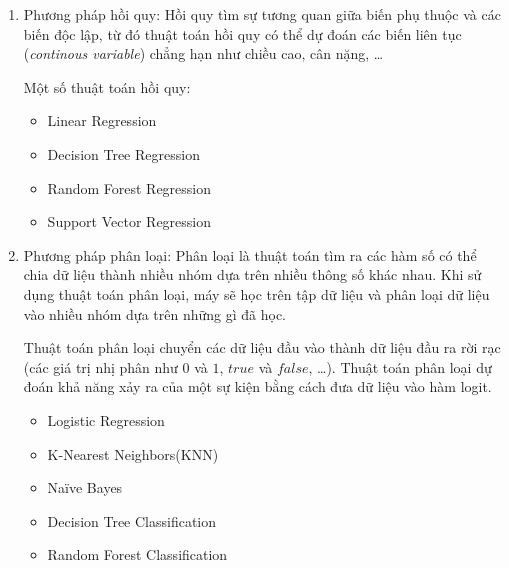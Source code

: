 \begin{enumerate}
    \item Phương pháp hồi quy:
          Hồi quy tìm sự tương quan giữa biến phụ thuộc và các biến độc lập, từ đó thuật toán hồi quy có thể dự đoán các biến liên tục (\textit{continous variable}) chẳng hạn như chiều cao, cân nặng, \dots\cite{webpage1}

          Một số thuật toán hồi quy:
          \begin{itemize}
              \item Linear Regression
              \item Decision Tree Regression
              \item Random Forest Regression
              \item Support Vector Regression
          \end{itemize}
    \item Phương pháp phân loại:
          Phân loại là thuật toán tìm ra các hàm số có thể chia dữ liệu thành nhiều nhóm dựa trên nhiều thông số khác nhau. Khi sử dụng thuật toán phân loại, máy sẽ học trên tập dữ liệu và phân loại dữ liệu vào nhiều nhóm dựa trên những gì đã học.

          Thuật toán phân loại chuyển các dữ liệu đầu vào thành dữ liệu đầu ra rời rạc (các giá trị nhị phân như $0$ và $1$, $true$ và $false$, \dots). Thuật toán phân loại dự đoán khả năng xảy ra của một sự kiện bằng cách đưa dữ liệu vào hàm logit.\cite{webpage1}
          \begin{itemize}
              \item Logistic Regression
              \item K-Nearest Neighbors(KNN)
              \item Naïve Bayes
              \item Decision Tree Classification
              \item Random Forest Classification
          \end{itemize}
\end{enumerate}

